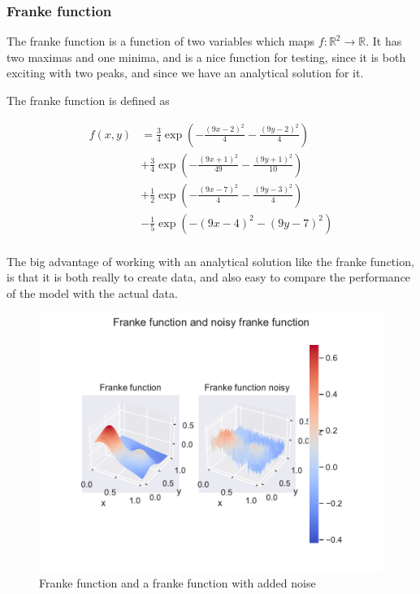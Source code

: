 \documentclass[12pt]{article}
\begin{document}
\subsubsection{Franke function}

The franke function is a function of two variables which maps $f:\mathbb{R}^{2}\to\mathbb{R}$.
It has two maximas and one minima, and is a nice function for testing, since it is both exciting with two peaks, and since we have an analytical solution for it. %

The franke function is defined as

\begin{align*}
    f(x,y)
    &= \frac{3}{4} \exp\left( - \frac{(9x-2)^2}{4}  - \frac{(9y-2)^2}{4} \right) \\
    &+ \frac{3}{4} \exp\left( - \frac{(9x+1)^2}{49} - \frac{(9y+1)^2}{10} \right) \\
    &+ \frac{1}{2} \exp\left( - \frac{(9x-7)^2}{4}  - \frac{(9y-3)^2}{4} \right) \\
    &- \frac{1}{5} \exp\left( - (9x-4)^2  - (9y-7)^2 \right) \\
\end{align*}

The big advantage of working with an analytical solution like the franke function, is that it is both really to create data, and also easy to compare the performance of the model with the actual data.



\begin{figure}[H]
    \centering
    \includegraphics[width=\columnwidth]{../src/output/franke_preview.pdf}
    \caption{Franke function and a franke function with added noise}
    \label{fig:franke_function}
\end{figure}
\end{document}
